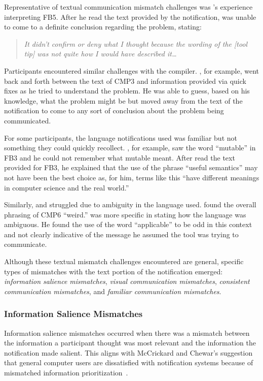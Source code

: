 Representative of textual communication mismatch challenges was 's experience interpreting FB5. After he read the text provided by the notification,  was unable to come to a definite conclusion regarding the problem, stating:

\begin{quote}
	\textit{It didn't confirm or deny what I thought because the wording of the [tool tip] was not quite how I would have described it\ldots}
\end{quote}

\noindent
Participants encountered similar challenges with the compiler. , for example, went back and forth between the text of CMP3 and information provided via quick fixes as he tried to understand the problem. 
He was able to guess, based on his knowledge, what the problem might be but moved away from the text of the notification to come to any sort of conclusion about the problem being communicated.

For some participants, the language notifications used was familiar but not something they could quickly recollect. 
, for example, saw the word ``mutable'' in FB3 and he could not remember what mutable meant.
After  read the text provided for FB3, he explained that the use of the phrase 
``useful semantics'' may not have been the best choice as, for him, terms like this ``have different meanings 
in computer science and the real world.''

Similarly,  and  struggled due to ambiguity in the language used.
 found the overall phrasing of CMP6 ``weird.'' 
 was more specific in stating how the language was ambiguous. 
He found the use of the word ``applicable'' to be odd in this context and not clearly indicative of the message he assumed 
the tool was trying to communicate. 

Although these textual mismatch challenges encountered are general, specific types of mismatches with the text portion of the notification emerged: \textit{information salience mismatches}, \textit{visual communication mismatches}, \textit{consistent communication mismatches}, and \textit{familiar communication mismatches}.

\subsubsection{Information Salience Mismatches}\label{subsec:buried}
Information salience mismatches occurred when there was a mismatch between the information a participant thought was most relevant and the information the notification made salient. 
This aligns with McCrickard and Chewar's suggestion that general computer users are dissatisfied with notification systems because of mismatched information prioritization~\cite{mccrickard2003attuning}.

